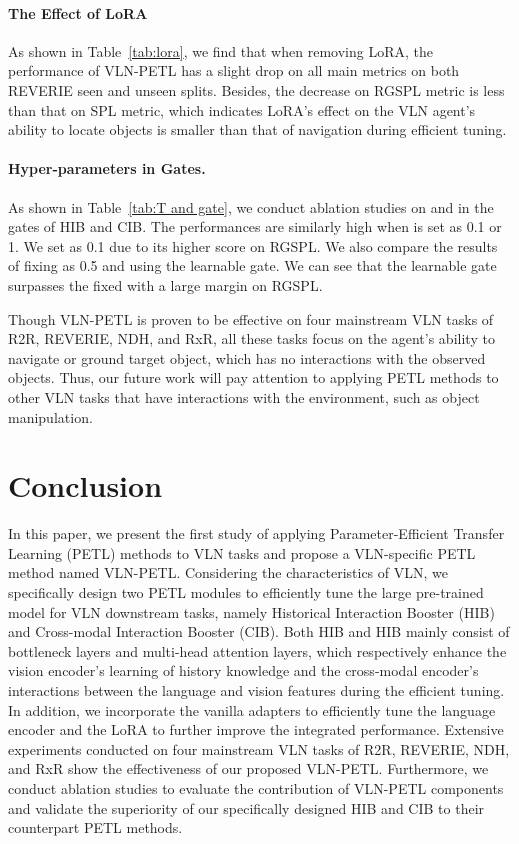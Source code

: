 \documentclass[10pt,twocolumn,letterpaper]{article}
\begin{document}
\paragraph{The Effect of LoRA}
As shown in Table~\ref{tab:lora}, we find that when removing LoRA, the performance of VLN-PETL has a slight drop on all main metrics on both REVERIE seen and unseen splits. Besides, the decrease on RGSPL metric is less than that on SPL metric, which indicates LoRA's effect on the VLN agent's ability to locate objects is smaller than that of navigation during efficient tuning.

\vspace{-8pt}
\paragraph{Hyper-parameters in Gates.}
As shown in Table~\ref{tab:T and gate}, we conduct ablation studies on  and  in the gates of HIB and CIB. The performances are similarly high when  is set as 0.1 or 1. We set  as 0.1 due to its higher score on RGSPL. We also compare the results of fixing  as 0.5 and using the learnable gate. We can see that the learnable gate  surpasses the fixed  with a large margin on RGSPL. 

Though VLN-PETL is proven to be effective on four mainstream VLN tasks of R2R, REVERIE, NDH, and RxR, all these tasks focus on the agent's ability to navigate or ground target object, which has no interactions with the observed objects. Thus, our future work will pay attention to applying PETL methods to other VLN tasks that have interactions with the environment, such as object manipulation.


\section{Conclusion}
In this paper, we present the first study of applying Parameter-Efficient Transfer Learning (PETL) methods to VLN tasks and propose a VLN-specific PETL method named VLN-PETL. Considering the characteristics of VLN, we specifically design two PETL modules to efficiently tune the large pre-trained model for VLN downstream tasks, namely Historical Interaction Booster (HIB) and Cross-modal Interaction Booster (CIB). Both HIB and HIB mainly consist of bottleneck layers and multi-head attention layers, which respectively enhance the vision encoder's learning of history knowledge and the cross-modal encoder's interactions between the language and vision features during the efficient tuning. In addition, we incorporate the vanilla adapters to efficiently tune the language encoder and the LoRA to further improve the integrated performance. Extensive experiments conducted on four mainstream VLN tasks of R2R, REVERIE, NDH, and RxR show the effectiveness of our proposed VLN-PETL. Furthermore, we conduct ablation studies to evaluate the contribution of VLN-PETL components and validate the superiority of our specifically designed HIB and CIB to their counterpart PETL methods.

 
{\small


}
\end{document}
